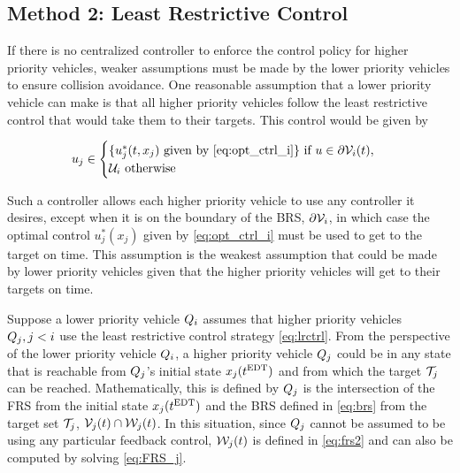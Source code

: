 \subsection{Method 2: Least Restrictive Control \label{sec:lrc}}
If there is no centralized controller to enforce the control policy for higher priority vehicles, weaker assumptions must be made by the lower priority vehicles to ensure collision avoidance. One reasonable assumption that a lower priority vehicle can make is that all higher priority vehicles follow the least restrictive control  that would take them to their targets. This control would be given by 

\begin{equation}
\label{eq:lrctrl} %
u_j \in \begin{cases} \{u_j^*(t, x_j) \text{ given by } \eqref{eq:opt_ctrl_i}\} \text{ if } u\in \partial \brs_i(t), \\
\cset_i  \text{ otherwise}
\end{cases}
\end{equation}


Such a controller allows each higher priority vehicle to use any controller it desires, except when it is on the boundary of the BRS, $\partial \mathcal{V}_i$, in which case the optimal control $u_j^*(x_j)$  given by \eqref{eq:opt_ctrl_i} must be used to get to the target on time. This assumption is the weakest assumption that could be made by lower priority vehicles given that the higher priority vehicles will get to their targets on time.

Suppose a lower priority vehicle $Q_i$ assumes that higher priority vehicles $Q_j, j < i$ use the least restrictive control strategy \eqref{eq:lrctrl}. From the perspective of the lower priority vehicle $Q_i$, a higher priority vehicle $Q_j$ could be in any state that is reachable from $Q_j$'s initial state $x_j(t^\text{EDT})$ and from which the target $\mathcal{T}_j$ can be reached. Mathematically, this is defined by $Q_j$ is the intersection of the FRS from the initial state $x_j(t^\text{EDT})$ and the BRS defined in \eqref{eq:brs} from the target set $\mathcal{T}_j$, $\mathcal{V}_j(t) \cap \mathcal{W}_j(t)$. In this situation, since $Q_j$ cannot be assumed to be using any particular feedback control, $\mathcal{W}_j(t)$ is defined in \eqref{eq:frs2} and can also be computed by solving \eqref{eq:FRS_j}.

